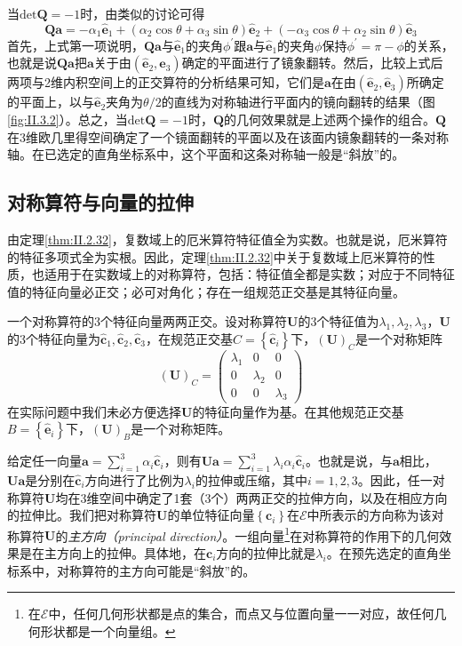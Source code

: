 \documentclass[main.tex]{subfiles}
\begin{document}
当$\mathrm{det}\mathbf{Q}=-1$时，由类似的讨论可得
\[\mathbf{Qa}=-\alpha_1\mathbf{\hat{e}}_1+\left(\alpha_2\cos\theta+\alpha_3\sin\theta\right)\mathbf{\hat{e}}_2+\left(-\alpha_3\cos\theta+\alpha_2\sin\theta\right)\mathbf{\hat{e}}_3\]
首先，上式第一项说明，$\mathbf{Qa}$与$\mathbf{\hat{e}}_1$的夹角$\phi^\prime$跟$\mathbf{a}$与$\mathbf{\hat{e}}_1$的夹角$\phi$保持$\phi^\prime=\pi-\phi$的关系，也就是说$\mathbf{Qa}$把$\mathbf{a}$关于由$\left(\mathbf{\hat{e}}_2,\mathbf{\hat{e}}_3\right)$确定的平面进行了镜象翻转。然后，比较上式后两项与2维内积空间上的正交算符的分析结果可知，它们是$\mathbf{a}$在由$\left(\mathbf{\hat{e}}_2,\mathbf{\hat{e}}_3\right)$所确定的平面上，以与$\mathbf{\hat{e}}_2$夹角为$\theta/2$的直线为对称轴进行平面内的镜向翻转的结果（图\ref{fig:II.3.2}）。总之，当$\mathrm{det}\mathbf{Q}=-1$时，$\mathbf{Q}$的几何效果就是上述两个操作的组合。$\mathbf{Q}$在3维欧几里得空间确定了一个镜面翻转的平面以及在该面内镜象翻转的一条对称轴。在已选定的直角坐标系中，这个平面和这条对称轴一般是“斜放”的。

\subsection{对称算符与向量的拉伸}\label{sec:II.3.3.2}
由定理\ref{thm:II.2.32}，复数域上的厄米算符特征值全为实数。也就是说，厄米算符的特征多项式全为实根。因此，定理\ref{thm:II.2.32}中关于复数域上厄米算符的性质，也适用于在实数域上的对称算符，包括：特征值全都是实数\cite[\S 5.3 定理3.4]{周胜林2012线性代数}；对应于不同特征值的特征向量必正交\cite[\S 5.3 定理3.5]{周胜林2012线性代数}；必可对角化\cite[\S 5.3 定理3.6]{周胜林2012线性代数}；存在一组规范正交基是其特征向量。

一个对称算符的3个特征向量两两正交。设对称算符$\mathbf{U}$的3个特征值为$\lambda_1,\lambda_2,\lambda_3$，$\mathbf{U}$的3个特征向量为$\mathbf{\hat{c}}_1,\mathbf{\hat{c}}_2,\mathbf{\hat{c}}_3$，在规范正交基$C=\left\{\mathbf{\hat{c}}_i\right\}$下，$\left(\mathbf{U}\right)_C$是一个对称矩阵
\[
    \left(\mathbf{U}\right)_C=\left(\begin{array}{ccc}\lambda_1&0&0\\0&\lambda_2&0\\0&0&\lambda_3\end{array}\right)
\]
在实际问题中我们未必方便选择$\mathbf{U}$的特征向量作为基。在其他规范正交基$B=\left\{\mathbf{\hat{e}}_i\right\}$下，$\left(\mathbf{U}\right)_B$是一个对称矩阵。

给定任一向量$\mathbf{a}=\sum_{i=1}^3\alpha_i\mathbf{\hat{c}}_i$，则有$\mathbf{Ua}=\sum_{i=1}^3\lambda_i\alpha_i\mathbf{\hat{c}}_i$。也就是说，与$\mathbf{a}$相比，$\mathbf{Ua}$是分别在$\mathbf{\hat{c}}_i$方向进行了比例为$\lambda_i$的拉伸或压缩，其中$i=1,2,3$。因此，任一对称算符$\mathbf{U}$均在3维空间中确定了1套（3个）两两正交的拉伸方向，以及在相应方向的拉伸比。我们把对称算符$\mathbf{U}$的单位特征向量$\left\{\mathbf{c}_i\right\}$在$\mathcal{E}$中所表示的方向称为该对称算符$\mathbf{U}$的\emph{主方向（principal direction）}。一组向量\footnote{在$\mathcal{E}$中，任何几何形状都是点的集合，而点又与位置向量一一对应，故任何几何形状都是一个向量组。}在对称算符的作用下的几何效果是在主方向上的拉伸。具体地，在$\mathbf{c}_i$方向的拉伸比就是$\lambda_i$。在预先选定的直角坐标系中，对称算符的主方向可能是“斜放”的。
\end{document}
